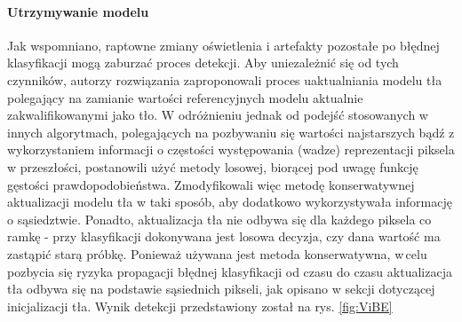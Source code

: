 \paragraph{Utrzymywanie modelu \\}
Jak wspomniano, raptowne zmiany oświetlenia i artefakty pozostałe po błędnej klasyfikacji mogą zaburzać proces detekcji. Aby uniezależnić się od tych czynników, autorzy rozwiązania zaproponowali proces uaktualniania modelu tła polegający na zamianie wartości referencyjnych modelu aktualnie zakwalifikowanymi jako tło. W odróżnieniu jednak od podejść stosowanych w innych algorytmach, polegających na pozbywaniu się wartości najstarszych bądź z wykorzystaniem informacji o częstości występowania (wadze) reprezentacji piksela w przeszłości, postanowili użyć metody losowej, biorącej pod uwagę funkcję gęstości prawdopodobieństwa. Zmodyfikowali więc metodę konserwatywnej aktualizacji modelu tła w taki sposób, aby dodatkowo wykorzystywała informację o sąsiedztwie. Ponadto, aktualizacja tła nie odbywa się dla każdego piksela co ramkę - przy klasyfikacji dokonywana jest losowa decyzja, czy dana wartość ma zastąpić starą próbkę. Ponieważ używana jest metoda konserwatywna, w\,celu pozbycia się ryzyka propagacji błędnej klasyfikacji od czasu do czasu aktualizacja tła odbywa się na podstawie sąsiednich pikseli, jak opisano w sekcji dotyczącej inicjalizacji tła. Wynik detekcji przedstawiony został na rys. \ref{fig:ViBE} 
